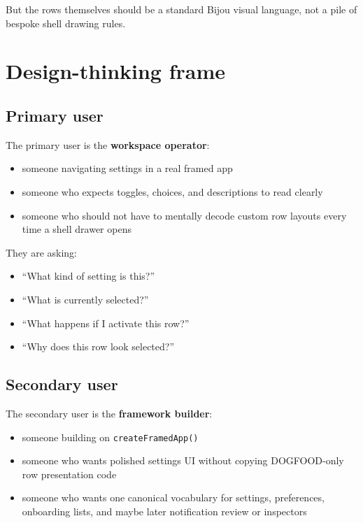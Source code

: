But the rows themselves should be a standard Bijou visual language, not a pile of bespoke shell drawing rules.

\section{Design-thinking frame}\label{record-054-design-thinking-frame}

\subsection{Primary user}\label{record-054-primary-user}

The primary user is the \textbf{workspace operator}:

\begin{itemize}
\tightlist
\item
  someone navigating settings in a real framed app
\item
  someone who expects toggles, choices, and descriptions to read clearly
\item
  someone who should not have to mentally decode custom row layouts every time a shell drawer opens
\end{itemize}

They are asking:

\begin{itemize}
\tightlist
\item
  ``What kind of setting is this?''
\item
  ``What is currently selected?''
\item
  ``What happens if I activate this row?''
\item
  ``Why does this row look selected?''
\end{itemize}

\subsection{Secondary user}\label{record-054-secondary-user}

The secondary user is the \textbf{framework builder}:

\begin{itemize}
\tightlist
\item
  someone building on \texttt{c\allowbreak{}r\allowbreak{}e\allowbreak{}a\allowbreak{}t\allowbreak{}e\allowbreak{}F\allowbreak{}r\allowbreak{}a\allowbreak{}m\allowbreak{}e\allowbreak{}d\allowbreak{}A\allowbreak{}p\allowbreak{}p\allowbreak{}(\allowbreak{})}
\item
  someone who wants polished settings UI without copying DOGFOOD-only row presentation code
\item
  someone who wants one canonical vocabulary for settings, preferences, onboarding lists, and maybe later notification review or inspectors
\end{itemize}

